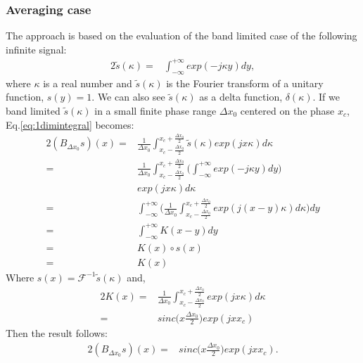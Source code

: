 \subsubsection{Averaging case}
The approach is based on the  evaluation of the band limited case of the following infinite signal:
\begin{alignat}{2}
\tilde{s}(\kappa) =& \int_{-\infty}^{+\infty}exp(-j\kappa y)dy, \label{eq:1dimintegral}
\end{alignat}
where $\kappa$ is a real number and $\tilde{s}(\kappa)$ is the Fourier transform of a unitary function, $s(y)=1$. We can also see 
$\tilde{s}(\kappa)$ as a delta function, $\delta (\kappa)$.
If we band limited $\tilde{s}(\kappa)$ in a small finite phase range  $\Delta x_0$ centered on the phase $x_c$, Eq.\ref{eq:1dimintegral} 
becomes:
\begin{alignat*}{2}
(B_{\Delta x_0}s)(x) =& \frac{1}{\Delta x_0}\int_{x_c-\frac{\Delta x_0}{2}}^{x_c+\frac{\Delta 
x_0}{2}}\tilde{s}(\kappa)exp(jx\kappa)d\kappa\\
		     =& \frac{1}{\Delta x_0}\int_{x_c-\frac{\Delta x_0}{2}}^{x_c+\frac{\Delta x_0}{2}}\bigg( 
\int_{-\infty}^{+\infty}exp(-j\kappa y)dy\bigg)\\ 
		      & exp(jx\kappa)d\kappa\\
		     =&\int_{-\infty}^{+\infty}\bigg( \frac{1}{\Delta x_0} \int_{x_c-\frac{\Delta x_0}{2}}^{x_c+\frac{\Delta 
x_0}{2}}exp(j(x-y)\kappa)d\kappa\bigg)dy\\
		     =&\int_{-\infty}^{+\infty}K(x-y)dy\\
		     =& K(x)\circ s(x)\\
		     =&K(x)
\end{alignat*}
Where $s(x)=\mathcal{F}^{-1}\tilde{s}(\kappa)$ and,
\begin{alignat*}{2}
 K(x)=& \frac{1}{\Delta x_0} \int_{x_c-\frac{\Delta x_0}{2}}^{x_c+\frac{\Delta x_0}{2}}exp(jx\kappa )d\kappa\\
     =& sinc \big(x\frac{\Delta x_0}{2}\big) exp(jxx_c)
\end{alignat*}
Then the result follows:
\begin{alignat}{2}
(B_{\Delta x_0}s)(x) = & sinc \big(x\frac{\Delta x_0}{2}\big) exp(jxx_c). \label{eq:1dimavegcase}
\end{alignat}
